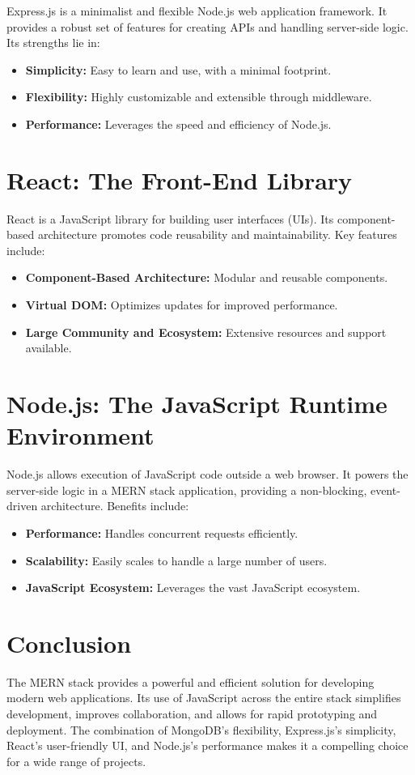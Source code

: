 \documentclass{article}
\begin{document}
Express.js is a minimalist and flexible Node.js web application framework.  It provides a robust set of features for creating APIs and handling server-side logic.  Its strengths lie in:

\begin{itemize}
    \item \textbf{Simplicity:}  Easy to learn and use, with a minimal footprint.
    \item \textbf{Flexibility:}  Highly customizable and extensible through middleware.
    \item \textbf{Performance:}  Leverages the speed and efficiency of Node.js.
\end{itemize}

\section{React: The Front-End Library}

React is a JavaScript library for building user interfaces (UIs).  Its component-based architecture promotes code reusability and maintainability.  Key features include:

\begin{itemize}
    \item \textbf{Component-Based Architecture:}  Modular and reusable components.
    \item \textbf{Virtual DOM:}  Optimizes updates for improved performance.
    \item \textbf{Large Community and Ecosystem:}  Extensive resources and support available.
\end{itemize}

\section{Node.js: The JavaScript Runtime Environment}

Node.js allows execution of JavaScript code outside a web browser.  It powers the server-side logic in a MERN stack application, providing a non-blocking, event-driven architecture.  Benefits include:

\begin{itemize}
    \item \textbf{Performance:}  Handles concurrent requests efficiently.
    \item \textbf{Scalability:}  Easily scales to handle a large number of users.
    \item \textbf{JavaScript Ecosystem:}  Leverages the vast JavaScript ecosystem.
\end{itemize}

\section{Conclusion}

The MERN stack provides a powerful and efficient solution for developing modern web applications.  Its use of JavaScript across the entire stack simplifies development, improves collaboration, and allows for rapid prototyping and deployment.  The combination of MongoDB's flexibility, Express.js's simplicity, React's user-friendly UI, and Node.js's performance makes it a compelling choice for a wide range of projects.
\end{document}
